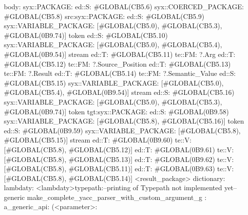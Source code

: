 body: syx::PACKAGE:
        ed::S: #GLOBAL(CB5.6)
            syx::COERCED_PACKAGE:
                #GLOBAL(CB5.8)
                 src:syx::PACKAGE:
                        ed::S: #GLOBAL(CB5.9) syx::VARIABLE_PACKAGE: [#GLOBAL(CB5.0), #GLOBAL(CB5.3), #GLOBAL(0B9.74)] token
                        ed::S: #GLOBAL(CB5.10) syx::VARIABLE_PACKAGE: [#GLOBAL(CB5.0), #GLOBAL(CB5.4), #GLOBAL(0B9.54)] stream
                        ed::T: #GLOBAL(CB5.11) te::FM: ?.Arg
                        ed::T: #GLOBAL(CB5.12) te::FM: ?.Source_Position
                        ed::T: #GLOBAL(CB5.13) te::FM: ?.Result
                        ed::T: #GLOBAL(CB5.14) te::FM: ?.Semantic_Value
                    ed::S: #GLOBAL(CB5.15)
                     syx::VARIABLE_PACKAGE:
                     [#GLOBAL(CB5.0), #GLOBAL(CB5.4), #GLOBAL(0B9.54)]
                     stream
                    ed::S: #GLOBAL(CB5.16)
                     syx::VARIABLE_PACKAGE:
                     [#GLOBAL(CB5.0), #GLOBAL(CB5.3), #GLOBAL(0B9.74)]
                     token
                tgt:syx::PACKAGE:
                    ed::S: #GLOBAL(0B9.58)
                     syx::VARIABLE_PACKAGE:
                     [#GLOBAL(CB5.8), #GLOBAL(CB5.16)]
                     token
                    ed::S: #GLOBAL(0B9.59)
                     syx::VARIABLE_PACKAGE:
                     [#GLOBAL(CB5.8), #GLOBAL(CB5.15)]
                     stream
                    ed::T: #GLOBAL(0B9.60)
                     te::V:
                     [#GLOBAL(CB5.8), #GLOBAL(CB5.12)]
                    ed::T: #GLOBAL(0B9.61)
                     te::V:
                     [#GLOBAL(CB5.8), #GLOBAL(CB5.13)]
                    ed::T: #GLOBAL(0B9.62)
                     te::V:
                     [#GLOBAL(CB5.8), #GLOBAL(CB5.11)]
                    ed::T: #GLOBAL(0B9.63)
                     te::V:
                     [#GLOBAL(CB5.8), #GLOBAL(CB5.14)]
         <result_package>
dictionary:
lambdaty:
  <lambdaty>typepath:--printing of Typepath not implemented yet--
generic make_complete_yacc_parser_with_custom_argument_g
:
a_generic_api:
(<parameter>:
